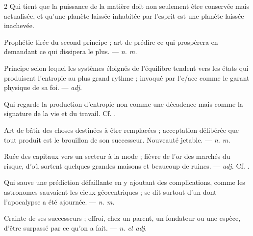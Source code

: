 \begin{multicols}{2}
 Qui tient que la puissance de la matière doit non seulement être conservée mais actualisée, et qu'une planète laissée inhabitée par l'esprit est une planète laissée inachevée.

 Prophétie tirée du second principe ; art de prédire ce qui prospérera en demandant ce qui dissipera le plus. —  \textit{n. m.}

 Principe selon lequel les systèmes éloignés de l'équilibre tendent vers les états qui produisent l'entropie au plus grand rythme ; invoqué par l'e/acc comme le garant physique de sa foi. —  \textit{adj.}

 Qui regarde la production d'entropie non comme une décadence mais comme la signature de la vie et du travail.  Cf. .

  Art de bâtir des choses destinées à être remplacées ; acceptation délibérée que tout produit est le brouillon de son successeur.   Nouveauté jetable.  —  \textit{n. m.}

 Ruée des capitaux vers un secteur à la mode ; fièvre de l'or des marchés du risque, d'où sortent quelques grandes maisons et beaucoup de ruines.   —  \textit{adj.} Cf. .

  Qui sauve une prédiction défaillante en y ajoutant des complications, comme les astronomes sauvaient les cieux géocentriques ; se dit surtout d'un  dont l'apocalypse a été ajournée. —  \textit{n. m.}

 Crainte de ses successeurs ; effroi, chez un parent, un fondateur ou une espèce, d'être surpassé par ce qu'on a fait. —  \textit{n. et adj.}


\end{multicols}
